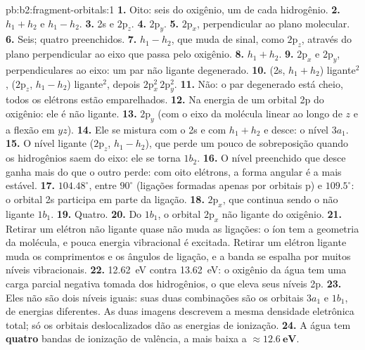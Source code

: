 \begin{solution}{pb:b2:fragment-orbitals:1}
\textbf{1.} Oito: seis do oxigênio, um de cada hidrogênio.
\textbf{2.} $h_1 + h_2$ e $h_1 - h_2$.
\textbf{3.} 2s e $2\mathrm p_z$.
\textbf{4.} $2\mathrm p_y$.
\textbf{5.} $2\mathrm p_x$, perpendicular ao plano molecular.
\textbf{6.} Seis; quatro preenchidos.
\textbf{7.} $h_1 - h_2$, que muda de sinal, como $2\mathrm p_z$, através do plano
perpendicular ao eixo que passa pelo oxigênio.
\textbf{8.} $h_1 + h_2$.
\textbf{9.} $2\mathrm p_x$ e $2\mathrm p_y$, perpendiculares ao eixo: um par não ligante
degenerado.
\textbf{10.} (2s, $h_1 + h_2$) ligante$^2$, ($2\mathrm p_z$, $h_1 - h_2$) ligante$^2$, depois
$2\mathrm p_x^2\,2\mathrm p_y^2$.
\textbf{11.} Não: o par degenerado está cheio, todos os elétrons estão emparelhados.
\textbf{12.} Na energia de um orbital 2p do oxigênio: ele é não ligante.
\textbf{13.} $2\mathrm p_y$ (com o eixo da molécula linear ao longo de $z$ e a flexão em $yz$).
\textbf{14.} Ele se mistura com o 2s e com $h_1 + h_2$ e desce: o nível $3a_1$.
\textbf{15.} O nível ligante ($2\mathrm p_z$, $h_1 - h_2$), que perde um pouco de
sobreposição quando os hidrogênios saem do eixo: ele se torna $1b_2$.
\textbf{16.} O nível preenchido que desce ganha mais do que o outro perde: com
oito elétrons, a forma angular é a mais estável.
\textbf{17.} $104.48^\circ$, entre $90^\circ$ (ligações formadas apenas por orbitais p) e
$109.5^\circ$: o orbital 2s participa em parte da ligação.
\textbf{18.} $2\mathrm p_x$, que continua sendo o não ligante $1b_1$.
\textbf{19.} Quatro.
\textbf{20.} Do $1b_1$, o orbital $2\mathrm p_x$ não ligante do oxigênio.
\textbf{21.} Retirar um elétron não ligante quase não muda as ligações: o íon
tem a geometria da molécula, e pouca energia vibracional é excitada. Retirar
um elétron ligante muda os comprimentos e os ângulos de ligação, e a banda se
espalha por muitos níveis vibracionais.
\textbf{22.} \qty{12.62}{eV} contra \qty{13.62}{eV}: o oxigênio da água tem uma
carga parcial negativa tomada dos hidrogênios, o que eleva seus níveis 2p.
\textbf{23.} Eles não são dois níveis iguais: suas duas combinações são os
orbitais $3a_1$ e $1b_1$, de energias diferentes. As duas imagens descrevem a
mesma densidade eletrônica total; só os orbitais deslocalizados dão as
energias de ionização.
\textbf{24.} A água tem \textbf{quatro} bandas de ionização de valência, a
mais baixa a $\boldsymbol{\approx \qty{12.6}{eV}}$.
\end{solution}
